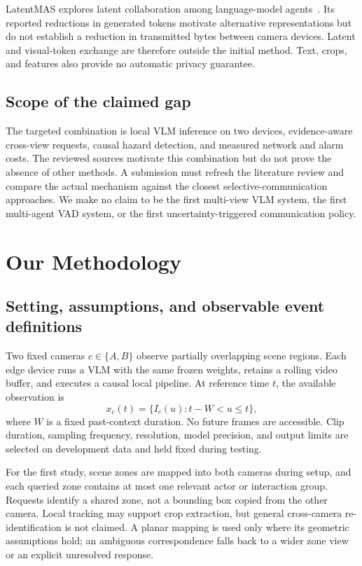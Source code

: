 \documentclass[10pt,a4paper]{article}
\begin{document}
LatentMAS explores latent collaboration among language-model agents~\cite{latent}. Its reported reductions in generated tokens motivate alternative representations but do not establish a reduction in transmitted bytes between camera devices. Latent and visual-token exchange are therefore outside the initial method. Text, crops, and features also provide no automatic privacy guarantee.

\subsection{Scope of the claimed gap}
The targeted combination is local VLM inference on two devices, evidence-aware cross-view requests, causal hazard detection, and measured network and alarm costs. The reviewed sources motivate this combination but do not prove the absence of other methods. A submission must refresh the literature review and compare the actual mechanism against the closest selective-communication approaches. We make no claim to be the first multi-view VLM system, the first multi-agent VAD system, or the first uncertainty-triggered communication policy.

\newpage
\section{Our Methodology}
\subsection{Setting, assumptions, and observable event definitions}
Two fixed cameras $c\in\{A,B\}$ observe partially overlapping scene regions. Each edge device runs a VLM with the same frozen weights, retains a rolling video buffer, and executes a causal local pipeline. At reference time $t$, the available observation is
\begin{equation}
 x_c(t)=\{I_c(u):t-W<u\leq t\},
\end{equation}
where $W$ is a fixed past-context duration. No future frames are accessible. Clip duration, sampling frequency, resolution, model precision, and output limits are selected on development data and held fixed during testing.

For the first study, scene zones are mapped into both cameras during setup, and each queried zone contains at most one relevant actor or interaction group. Requests identify a shared zone, not a bounding box copied from the other camera. Local tracking may support crop extraction, but general cross-camera re-identification is not claimed. A planar mapping is used only where its geometric assumptions hold; an ambiguous correspondence falls back to a wider zone view or an explicit unresolved response.
\end{document}
